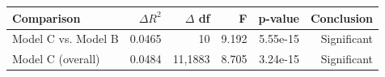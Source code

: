 \begin{tabular}{lrrrrr}
\toprule
Comparison & $\Delta R^2$ & $\Delta$ df & F & p-value & Conclusion \\
\midrule
Model C vs. Model B & 0.0465 & 10 & 9.192 & 5.55e-15 & Significant \\
Model C (overall) & 0.0484 & 11,1883 & 8.705 & 3.24e-15 & Significant \\
\bottomrule
\end{tabular}
